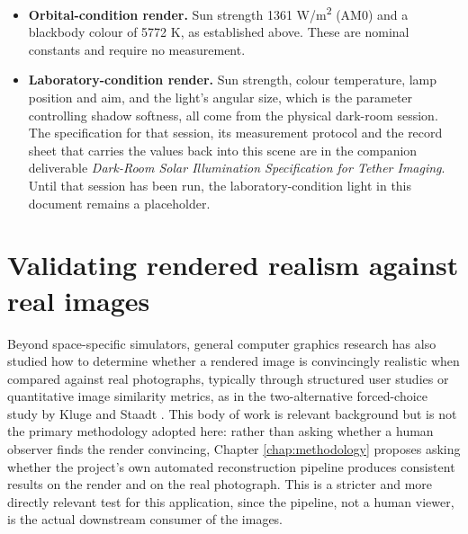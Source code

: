 \begin{itemize}
    \item \textbf{Orbital-condition render.} Sun strength 1361 W/m\textsuperscript{2} (AM0) and a blackbody colour of 5772 K, as established above. These are nominal constants and require no measurement.
    \item \textbf{Laboratory-condition render.} Sun strength, colour temperature, lamp position and aim, and the light's angular size, which is the parameter controlling shadow softness, all come from the physical dark-room session. The specification for that session, its measurement protocol and the record sheet that carries the values back into this scene are in the companion deliverable \textit{Dark-Room Solar Illumination Specification for Tether Imaging}. Until that session has been run, the laboratory-condition light in this document remains a placeholder.
\end{itemize}


\section{Validating rendered realism against real images}

Beyond space-specific simulators, general computer graphics research has also studied how to determine whether a rendered image is convincingly realistic when compared against real photographs, typically through structured user studies or quantitative image similarity metrics, as in the two-alternative forced-choice study by Kluge and Staadt \cite{kluge2024photorealism}. This body of work is relevant background but is not the primary methodology adopted here: rather than asking whether a human observer finds the render convincing, Chapter \ref{chap:methodology} proposes asking whether the project's own automated reconstruction pipeline produces consistent results on the render and on the real photograph. This is a stricter and more directly relevant test for this application, since the pipeline, not a human viewer, is the actual downstream consumer of the images.
